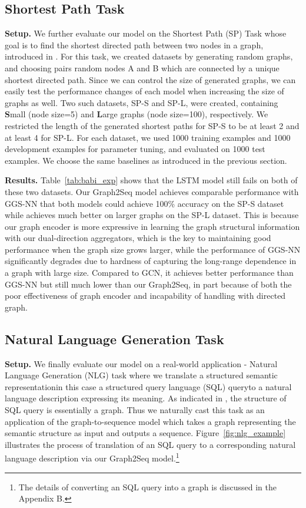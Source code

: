 \documentclass{article} \usepackage{iclr2019_conference,times}
\begin{document}
\subsection{Shortest Path Task}
\textbf{Setup.} We further evaluate our model on the Shortest Path (SP) Task whose goal is to find the shortest directed path between two nodes in a graph, introduced in \citep{li2015gated}. For this task, we created datasets by generating random graphs, and choosing pairs random nodes A and B which are connected by a unique shortest directed path. Since we can control the size of generated graphs, we can easily test the performance changes of each model when increasing the size of graphs as well. Two such datasets, SP-S and SP-L, were created, containing \textbf{S}mall (node size=5) and \textbf{L}arge graphs (node size=100), respectively.
We restricted the length of the generated shortest paths for SP-S to be at least 2 and at least 4 for SP-L.
For each dataset, we used 1000 training examples and 1000 development examples for parameter tuning,
and evaluated on 1000 test examples. We choose the same baselines as introduced in the previous section.

\textbf{Results.} Table~\ref{tab:babi_exp} shows that the LSTM model still fails on both of these two datasets. Our Graph2Seq model achieves comparable performance with GGS-NN that both models could achieve 100\% accuracy on the SP-S dataset while achieves much better on larger graphs on the SP-L dataset. This is because our graph encoder is more expressive in learning the graph structural information with our dual-direction aggregators, which is the key to maintaining good performance when the graph size grows larger, while the performance of GGS-NN significantly degrades due to hardness of capturing the long-range dependence in a graph with large size. Compared to GCN, it achieves better performance than GGS-NN but still much lower than our Graph2Seq, in part because of both the poor effectiveness of graph encoder and incapability of handling with directed graph. 

\subsection{Natural Language Generation Task}
\textbf{Setup.} We finally evaluate our model on a real-world application - Natural Language Generation (NLG) task where we translate a structured semantic representation\textemdash{}in this case a structured query language (SQL) query\textemdash{}to a natural language description expressing its meaning. As indicated in \citep{DBLP:journals/is/SpiliopoulouH92}, the structure of SQL query is essentially a graph. Thus we naturally cast this task as an application of the graph-to-sequence model which takes a graph representing the semantic structure as input and outputs a sequence.  Figure~\ref{fig:nlg_example} illustrates the process of translation of an SQL query to a corresponding natural language description via our Graph2Seq model.\footnote{The details of converting an SQL query into a graph is discussed in the Appendix B.}
\end{document}
